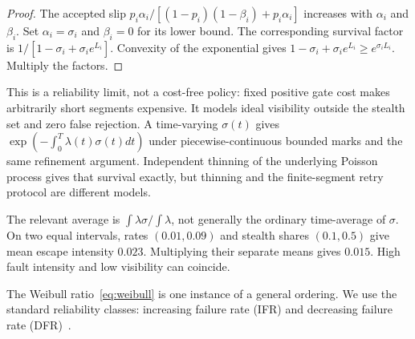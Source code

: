 \documentclass[11pt]{article}
\theoremstyle{definition}
\theoremstyle{remark}
\begin{document}
\begin{proof}
The accepted slip $p_i\alpha_i/[(1-p_i)(1-\beta_i)+p_i\alpha_i]$ increases with
$\alpha_i$ and $\beta_i$. Set $\alpha_i=\sigma_i$ and $\beta_i=0$ for its lower bound.
The corresponding survival factor is $1/[1-\sigma_i+\sigma_i e^{L_i}]$.
Convexity of the exponential gives $1-\sigma_i+\sigma_i e^{L_i}\ge e^{\sigma_i L_i}$.
Multiply the factors.
\end{proof}
This is a reliability limit, not a cost-free policy: fixed positive gate cost makes arbitrarily
short segments expensive. It models ideal visibility outside the stealth set and zero false
rejection. A time-varying $\sigma(t)$ gives $\exp(-\int_0^T\lambda(t)\sigma(t)dt)$ under
piecewise-continuous bounded marks and the same refinement argument. Independent thinning of
the underlying Poisson process gives that survival exactly, but thinning and the finite-segment
retry protocol are different models.

The relevant average is $\int\lambda\sigma/\int\lambda$, not generally the ordinary
time-average of $\sigma$. On two equal intervals, rates $(0.01,0.09)$ and stealth shares
$(0.1,0.5)$ give mean escape intensity $0.023$. Multiplying their separate means gives $0.015$.
High fault intensity and low visibility can coincide.

The Weibull ratio~\eqref{eq:weibull} is one instance of a general ordering. We use the standard
reliability classes: increasing failure rate (IFR) and decreasing failure rate (DFR)~\cite{bp}.
\end{document}
